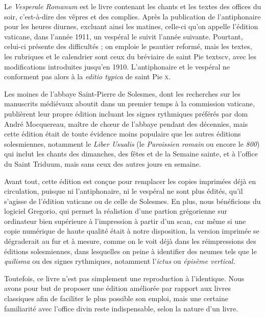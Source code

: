 
\begin{frpars}
Le \textit{Vesperale Romanum} est le livre contenant les chants et les textes des offices du soir, c’est-à-dire des vêpres et des complies. Après la publication de l'antiphonaire pour les heures diurnes, excluant ainsi les matines, celle-ci qu'on appelle l'édition vaticane, dans l'année 1911, un vespéral le suivit l'année suivante. Pourtant, celui-ci présente des difficultés ; on emploie le psautier reformé, mais les textes, les rubriques et le calendrier sont ceux du bréviaire de saint Pie textsc{v}, avec les modifications introduites jusqu'en 1910. L'antiphonaire et le vespéral ne conforment pas alors à la \textit{editio typica} de saint Pie \textsc{x}.

Les moines de l'abbaye Saint-Pierre de Solesmes, dont les recherches sur les manuscrits médiévaux aboutit dans un premier temps à la commission vaticane, publièrent leur propre édition incluant les signes rythmiques préférés par dom André Mocquereau, maître de chœur de l'abbaye pendant des décennies, mais cette édition était de toute évidence moins populaire que les autres éditions solesmiennes, notamment le \textit{Liber Usualis} (le \textit{Paroissien romain} ou encore le \textit{800}) qui inclut les chants des dimanches, des fêtes et de la Semaine sainte, et à l'office du Saint Triduum, mais sans ceux des autres jours en semaine.


Avant tout, cette édition est conçue pour remplacer les copies imprimées déjà en circulation, puisque ni l'antiphonaire, ni le vespéral ne sont plus édités, qu'il s'agisse de l'édition vaticane ou de celle de Solesmes. En plus, nous bénéficions du logiciel Gregorio, qui permet la réalistion d'une partion grégorienne sur ordinateur bien supérieure à l'impression à partir d'un scan, car même si une copie numérique de haute qualité était à notre disposition, la version imprimée se dégraderait au fur et à mesure, comme on le voit déjà dans les réimpressions des éditions solesmiennes, dans lesquelles on peine à identifier des neumes tels que le \textit{quilisma} ou des signes rythmiques, notamment l'\textit{ictus} ou \textit{épisème vertical.}

Toutefois, ce livre n'est pas simplement une reproduction à l'identique. Nous avons pour but de proposer une édition améliorée par rapport aux livres classiques afin de faciliter le plus possible son emploi, mais une certaine familiarité avec l'office divin reste indispensable, selon la nature d'un livre.


\end{frpars}
